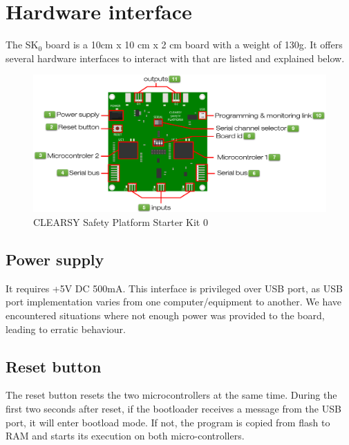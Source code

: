 \chapter{Hardware interface}

The SK$_0$ board is a 10cm x 10 cm x 2 cm board with a weight of 130g. It offers several hardware interfaces to interact with that are listed and explained below.

\begin{figure}[h]
\centering\includegraphics[scale=0.28]{Pictures/chapterAnnexes/SK0-description.png}
\caption{CLEARSY Safety Platform Starter Kit 0}
\label{annexes:SK0-HW-interface}
\end{figure}

\section{Power supply}

It requires +5V DC 500mA. This interface is privileged over USB port, as USB port implementation varies from one computer/equipment to another. We have encountered situations where not enough power was provided to the board, leading to erratic behaviour.

\section{Reset button}

The reset button resets the two microcontrollers at the same time. During the first two seconds after reset, if the bootloader receives a message from the USB port, it will enter bootload mode. If not, the program is copied from flash to RAM and starts its execution on both micro-controllers.

